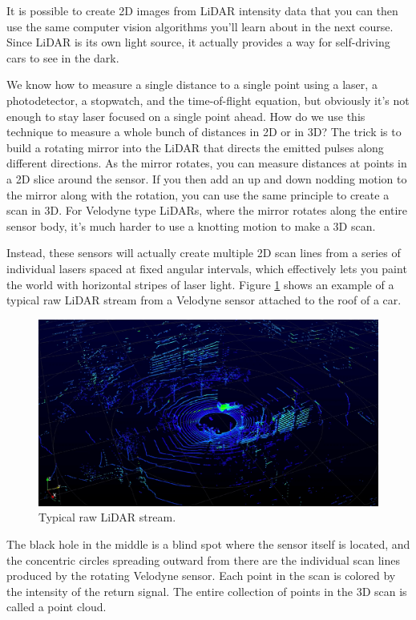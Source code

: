 It is possible to create 2D images from LiDAR intensity data that
you can then use the same computer vision algorithms you'll
learn about in the next course. Since LiDAR is its own light source, it actually provides a way for
self-driving cars to see in the dark. 

We know how to measure a single distance to a single point using a laser, a photodetector, a stopwatch, and
the time-of-flight equation, but obviously it's not enough to stay laser focused on a single point ahead. 
How do we use this technique to measure a whole bunch of distances in 2D or in 3D?  The trick is to build
a rotating mirror into the LiDAR that directs the emitted pulses
along different directions. As the mirror rotates, you can measure distances at points
in a 2D slice around the sensor. If you then add an up
and down nodding motion to the mirror along with the rotation, you can use the same principle
to create a scan in 3D. For Velodyne type LiDARs, where the mirror rotates
along the entire sensor body, it's much harder to use
a knotting motion to make a 3D scan. 

Instead, these sensors will actually create multiple 2D scan lines from a series of individual lasers spaced at
fixed angular intervals, which effectively lets you paint the world with horizontal
stripes of laser light. Figure \ref{lidar_4} shows an example of
a typical raw LiDAR stream from a Velodyne sensor
attached to the roof of a car. 

\begin{figure}[!htb]
\begin{center}
\includegraphics[scale=0.280]{img/hardware/lidar_4.jpeg}
\end{center}
\caption{Typical raw LiDAR stream.}
\label{lidar_4}
\end{figure}

The black hole in the middle is a blind spot where the sensor
itself is located, and the concentric circles
spreading outward from there are the individual scan lines produced
by the rotating Velodyne sensor. Each point in the scan is colored by
the intensity of the return signal. The entire collection of points in the 3D scan is called a point cloud. 

